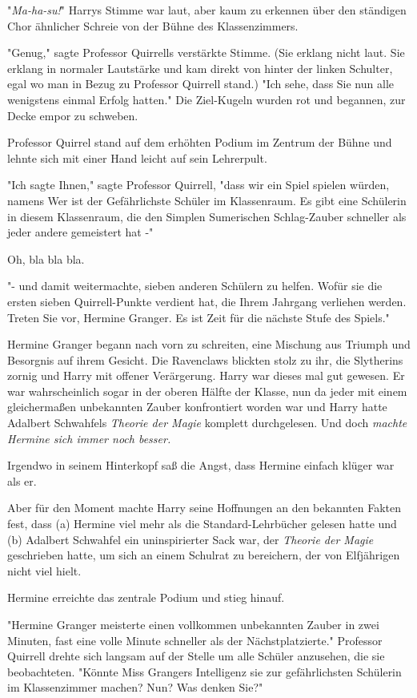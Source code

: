 {"\emph{Ma-ha-su!}" Harrys Stimme war laut, aber kaum zu erkennen über den ständigen Chor ähnlicher Schreie von der Bühne des Klassenzimmers.

"Genug," sagte Professor Quirrells verstärkte Stimme. (Sie erklang nicht laut. Sie erklang in normaler Lautstärke und kam direkt von hinter der linken Schulter, egal wo man in Bezug zu Professor Quirrell stand.) "Ich sehe, dass Sie nun alle wenigstens einmal Erfolg hatten." Die Ziel-Kugeln wurden rot und begannen, zur Decke empor zu schweben.

Professor Quirrel stand auf dem erhöhten Podium im Zentrum der Bühne und lehnte sich mit einer Hand leicht auf sein Lehrerpult.

"Ich sagte Ihnen," sagte Professor Quirrell, "dass wir ein Spiel spielen würden, namens Wer ist der Gefährlichste Schüler im Klassenraum. Es gibt eine Schülerin in diesem Klassenraum, die den Simplen Sumerischen Schlag-Zauber schneller als jeder andere gemeistert hat -"

Oh, bla bla bla.

"- und damit weitermachte, sieben anderen Schülern zu helfen. Wofür sie die ersten sieben Quirrell-Punkte verdient hat, die Ihrem Jahrgang verliehen werden. Treten Sie vor, Hermine Granger. Es ist Zeit für die nächste Stufe des Spiels."

Hermine Granger begann nach vorn zu schreiten, eine Mischung aus Triumph und Besorgnis auf ihrem Gesicht. Die Ravenclaws blickten stolz zu ihr, die Slytherins zornig und Harry mit offener Verärgerung. Harry war dieses mal gut gewesen. Er war wahrscheinlich sogar in der oberen Hälfte der Klasse, nun da jeder mit einem gleichermaßen unbekannten Zauber konfrontiert worden war und Harry hatte Adalbert Schwahfels \emph{Theorie der Magie} komplett durchgelesen. Und doch \emph{machte Hermine sich immer noch besser.}

Irgendwo in seinem Hinterkopf saß die Angst, dass Hermine einfach klüger war als er.

Aber für den Moment machte Harry seine Hoffnungen an den bekannten Fakten fest, dass (a) Hermine viel mehr als die Standard-Lehrbücher gelesen hatte und (b) Adalbert Schwahfel ein uninspirierter Sack war, der \emph{Theorie der Magie} geschrieben hatte, um sich an einem Schulrat zu bereichern, der von Elfjährigen nicht viel hielt.

Hermine erreichte das zentrale Podium und stieg hinauf.

"Hermine Granger meisterte einen vollkommen unbekannten Zauber in zwei Minuten, fast eine volle Minute schneller als der Nächstplatzierte." Professor Quirrell drehte sich langsam auf der Stelle um alle Schüler anzusehen, die sie beobachteten. "Könnte Miss Grangers Intelligenz sie zur gefährlichsten Schülerin im Klassenzimmer machen? Nun? Was denken Sie?"

}
